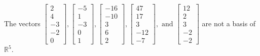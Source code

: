 \begin{exercise}
\begin{exerciseStatement}
  \end{exerciseStatement}
  \begin{exerciseAnswer}
   The vectors \(\left[\begin{array}{r}
2 \\
4 \\
-3 \\
-2 \\
0
\end{array}\right] , \left[\begin{array}{r}
-5 \\
1 \\
-3 \\
0 \\
1
\end{array}\right] , \left[\begin{array}{r}
-16 \\
-10 \\
3 \\
6 \\
2
\end{array}\right] , \left[\begin{array}{r}
47 \\
17 \\
3 \\
-12 \\
-7
\end{array}\right] , \text{ and } \left[\begin{array}{r}
12 \\
2 \\
3 \\
-2 \\
-2
\end{array}\right]\) 
  	 are not  a basis of \(\mathbb{R}^5\).
  


  \end{exerciseAnswer}
\end{exercise}